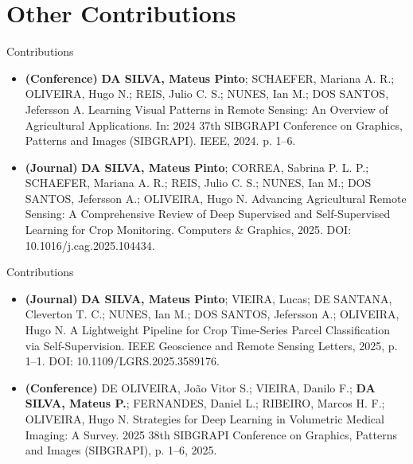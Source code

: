 \section{Other Contributions}

\begin{frame}{Contributions}
\begin{itemize}
  \item \textbf{(Conference)} \textbf{DA SILVA, Mateus Pinto}; SCHAEFER, Mariana A. R.; OLIVEIRA, Hugo N.; REIS, Julio C. S.; NUNES, Ian M.; DOS SANTOS, Jefersson A. Learning Visual Patterns in Remote Sensing: An Overview of Agricultural Applications. In: 2024 37th SIBGRAPI Conference on Graphics, Patterns and Images (SIBGRAPI). IEEE, 2024. p. 1–6.
  \item \textbf{(Journal)} \textbf{DA SILVA, Mateus Pinto}; CORREA, Sabrina P. L. P.; SCHAEFER, Mariana A. R.; REIS, Julio C. S.; NUNES, Ian M.; DOS SANTOS, Jefersson A.; OLIVEIRA, Hugo N. Advancing Agricultural Remote Sensing: A Comprehensive Review of Deep Supervised and Self-Supervised Learning for Crop Monitoring. Computers \& Graphics, 2025. DOI: 10.1016/j.cag.2025.104434.
\end{itemize}
\end{frame}

\begin{frame}{Contributions}
\begin{itemize}
    \item \textbf{(Journal)} \textbf{DA SILVA, Mateus Pinto}; VIEIRA, Lucas; DE SANTANA, Cleverton T. C.; NUNES, Ian M.; DOS SANTOS, Jefersson A.; OLIVEIRA, Hugo N. A Lightweight Pipeline for Crop Time-Series Parcel Classification via Self-Supervision. IEEE Geoscience and Remote Sensing Letters, 2025, p. 1–1. DOI: 10.1109/LGRS.2025.3589176.
    \item \textbf{(Conference)} DE OLIVEIRA, João Vitor S.; VIEIRA, Danilo F.; \textbf{DA SILVA, Mateus P.}; FERNANDES, Daniel L.; RIBEIRO, Marcos H. F.; OLIVEIRA, Hugo N. Strategies for Deep Learning in Volumetric Medical Imaging: A Survey. 2025 38th SIBGRAPI Conference on Graphics, Patterns and Images (SIBGRAPI), p. 1–6, 2025.
\end{itemize}
\end{frame}

